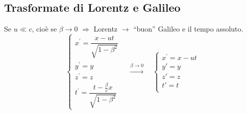 \subsection{Trasformate di Lorentz e Galileo}
Se $u\ll c$, cioè se $\beta\rightarrow 0$ $\Rightarrow$ Lorentz $\rightarrow$ ``buon'' Galileo e il tempo assoluto.
\[\left\{
\begin{array}{l}
x^\prime=\dfrac{x-ut}{\sqrt{1-\beta^2}}\\
y^\prime=y\\
z^\prime=z\\
t^\prime=\dfrac{t-\frac{\beta}{c}x}{\sqrt{1-\beta^2}}
\end{array}\right.
\quad \stackrel{\beta\rightarrow 0}{\longrightarrow} \quad
\left\{
\begin{array}{l}
x^\prime=x-ut\\
y'=y\\
z'=z\\
t'=t\\
\end{array}\right.\]
 
